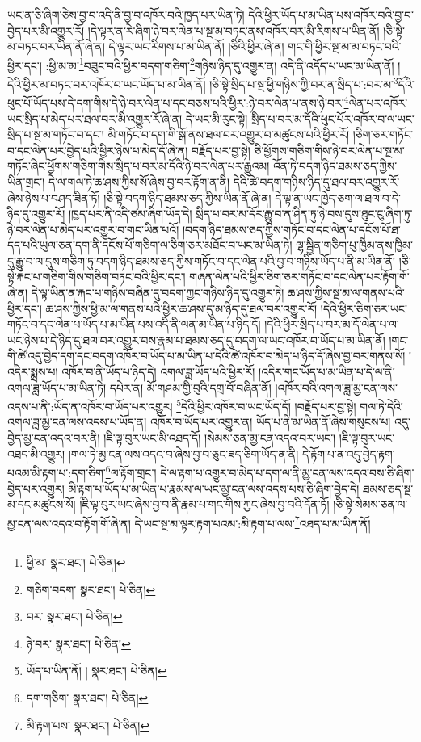 ཡང་ན་ཅི་ཞིག་ཅེས་བྱ་བ་འདི་ནི་བྱ་བ་འཁོར་བའི་ཁྱད་པར་ཡིན་ཏེ། དེའི་ཕྱིར་ཡོད་པ་མ་ཡིན་པས་འཁོར་བའི་བྱ་བ་བྱེད་པར་མི་འགྱུར་རོ། །དེ་ལྟར་ན་རེ་ཞིག་ཉེ་བར་ལེན་པ་སྔ་མ་བཏང་ནས་འཁོར་བར་མི་རིགས་པ་ཡིན་ནོ། །ཅི་སྟེ་མ་བཏང་བར་ཡིན་ནོ་ཞེ་ན། དེ་ལྟར་ཡང་རིགས་པ་མ་ཡིན་ནོ། །ཅིའི་ཕྱིར་ཞེ་ན། གང་གི་ཕྱིར་སྔ་མ་མ་བཏང་བའི་ཕྱིར་དང་། :ཕྱི་མ་མ་\footnote{ཕྱི་མ་  སྣར་ཐང་།  པེ་ཅིན། }བཟུང་བའི་ཕྱིར་བདག་གཅིག་\footnote{གཅིག་བདག་  སྣར་ཐང་།  པེ་ཅིན། }གཉིས་ཉིད་དུ་འགྱུར་ན། འདི་ནི་འདོད་པ་ཡང་མ་ཡིན་ནོ། །དེའི་ཕྱིར་མ་བཏང་བར་འཁོར་བ་ཡང་ཡོད་པ་མ་ཡིན་ནོ། །ཅི་སྟེ་སྲིད་པ་སྔ་ཕྱི་གཉིས་ཀྱི་བར་ན་སྲིད་པ་:བར་མ་\footnote{བར་  སྣར་ཐང་།  པེ་ཅིན། }དོའི་ཕུང་པོ་ཡོད་པས་དེ་དག་གིས་དེ་ཉེ་བར་ལེན་པ་དང་བཅས་པའི་ཕྱིར་:ཉེ་བར་ལེན་པ་ནས་ཉེ་བར་\footnote{ཉེ་བར་  སྣར་ཐང་།  པེ་ཅིན། }ལེན་པར་འཁོར་ཡང་སྲིད་པ་མེད་པར་ཐལ་བར་མི་འགྱུར་རོ་ཞེ་ན། དེ་ཡང་མི་རུང་སྟེ། སྲིད་པ་བར་མ་དོའི་ཕུང་པོར་འཁོར་བ་ལ་ཡང་སྲིད་པ་སྔ་མ་གཏོང་བ་དང་། མི་གཏོང་བ་དག་གི་སྒོ་ནས་ཐལ་བར་འགྱུར་བ་མཚུངས་པའི་ཕྱིར་རོ། །ཅིག་ཅར་གཏོང་བ་དང་ལེན་པར་བྱེད་པའི་ཕྱིར་ཉེས་པ་མེད་དོ་ཞེ་ན། བརྗོད་པར་བྱ་སྟེ། ཅི་ཕྱོགས་གཅིག་གིས་ཉེ་བར་ལེན་པ་སྔ་མ་གཏོང་ཞིང་ཕྱོགས་གཅིག་གིས་སྲིད་པ་བར་མ་དོའི་ཉེ་བར་ལེན་པར་རྒྱུའམ། འོན་ཏེ་བདག་ཉིད་ཐམས་ཅད་ཀྱིས་ཡིན་གྲང་། དེ་ལ་གལ་ཏེ་ཆ་ཤས་ཀྱིས་སོ་ཞེས་བྱ་བར་རྟོག་ན་ནི། དེའི་ཚེ་བདག་གཉིས་ཉིད་དུ་ཐལ་བར་འགྱུར་རོ་ཞེས་ཉེས་པ་བཤད་ཟིན་ཏོ། །ཅི་སྟེ་བདག་ཉིད་ཐམས་ཅད་ཀྱིས་ཡིན་ནོ་ཞེ་ན། དེ་ལྟ་ན་ཡང་ཁྱེད་ཅག་ལ་ཐལ་བ་དེ་ཉིད་དུ་འགྱུར་རོ། །ཁྱད་པར་ནི་འདི་ཙམ་ཞིག་ཡོད་དེ། སྲིད་པ་བར་མ་དོར་རྒྱུ་བ་ན་ཤིན་ཏུ་ཉེ་བས་དུས་ཐུང་ངུ་ཞིག་ཏུ་ཉེ་བར་ལེན་པ་མེད་པར་འགྱུར་བ་གང་ཡིན་པའོ། །བདག་ཉིད་ཐམས་ཅད་ཀྱིས་གཏོང་བ་དང་ལེན་པ་དངོས་པོ་ཐ་དད་པའི་ཡུལ་ཅན་དག་ནི་དངོས་པོ་གཅིག་ལ་ཅིག་ཅར་མཐོང་བ་ཡང་མ་ཡིན་ཏེ། ལྷ་སྦྱིན་གཅིག་པུ་ཁྱིམ་ནས་ཁྱིམ་དུ་རྒྱུ་བ་ལ་དུས་གཅིག་ཏུ་བདག་ཉིད་ཐམས་ཅད་ཀྱིས་གཏོང་བ་དང་ལེན་པའི་བྱ་བ་གཉིས་ཡོད་པ་ནི་མ་ཡིན་ནོ། །ཅི་སྟེ་རྐང་པ་གཅིག་གིས་གཅིག་བཏང་བའི་ཕྱིར་དང་། གཞན་ལེན་པའི་ཕྱིར་ཅིག་ཅར་གཏོང་བ་དང་ལེན་པར་རྟོག་གོ་ཞེ་ན། དེ་ལྟ་ཡིན་ན་རྐང་པ་གཉིས་བཞིན་དུ་བདག་ཀྱང་གཉིས་ཉིད་དུ་འགྱུར་ཏེ། ཆ་ཤས་ཀྱིས་སྔ་མ་ལ་གནས་པའི་ཕྱིར་དང་། ཆ་ཤས་ཀྱིས་ཕྱི་མ་ལ་གནས་པའི་ཕྱིར་ཆ་ཤས་དུ་མ་ཉིད་དུ་ཐལ་བར་འགྱུར་རོ། །དེའི་ཕྱིར་ཅིག་ཅར་ཡང་གཏོང་བ་དང་ལེན་པ་ཡོད་པ་མ་ཡིན་པས་འདི་ནི་ལན་མ་ཡིན་པ་ཉིད་དོ། །དེའི་ཕྱིར་སྲིད་པ་བར་མ་དོ་ལེན་པ་ལ་ཡང་ཉེས་པ་དེ་ཉིད་དུ་ཐལ་བར་འགྱུར་བས་རྣམ་པ་ཐམས་ཅད་དུ་བདག་ལ་ཡང་འཁོར་བ་ཡོད་པ་མ་ཡིན་ནོ། །གང་གི་ཚེ་འདུ་བྱེད་དག་དང་བདག་འཁོར་བ་ཡོད་པ་མ་ཡིན་པ་དེའི་ཚེ་འཁོར་བ་མེད་པ་ཉིད་དོ་ཞེས་བྱ་བར་གནས་སོ། །འདིར་སྨྲས་པ། འཁོར་བ་ནི་ཡོད་པ་ཉིད་དེ། འགལ་ཟླ་ཡོད་པའི་ཕྱིར་རོ། །འདིར་གང་ཡོད་པ་མ་ཡིན་པ་དེ་ལ་ནི་འགལ་ཟླ་ཡོད་པ་མ་ཡིན་ཏེ། དཔེར་ན། མོ་གཤམ་གྱི་བུའི་དགྲ་བོ་བཞིན་ནོ། །འཁོར་བའི་འགལ་ཟླ་མྱ་ངན་ལས་འདས་པ་ནི་:ཡོད་ན་འཁོར་བ་ཡོད་པར་འགྱུར། \footnote{ཡོད་པ་ཡིན་ནོ། །   སྣར་ཐང་།  པེ་ཅིན། }དེའི་ཕྱིར་འཁོར་བ་ཡང་ཡོད་དོ། །བརྗོད་པར་བྱ་སྟེ། གལ་ཏེ་དེའི་འགལ་ཟླ་མྱ་ངན་ལས་འདས་པ་ཡོད་ན། འཁོར་བ་ཡོད་པར་འགྱུར་ན། ཡོད་པ་ནི་མ་ཡིན་ནོ་ཞེས་གསུངས་པ། འདུ་བྱེད་མྱ་ངན་འདའ་བར་ནི། །ཇི་ལྟ་བུར་ཡང་མི་འཐད་དོ། །སེམས་ཅན་མྱ་ངན་འདའ་བར་ཡང་། །ཇི་ལྟ་བུར་ཡང་འཐད་མི་འགྱུར། །གལ་ཏེ་མྱ་ངན་ལས་འདའ་བ་ཞེས་བྱ་བ་ཅུང་ཟད་ཅིག་ཡོད་ན་ནི། དེ་རྟོག་པ་ན་འདུ་བྱེད་རྟག་པའམ་མི་རྟག་པ་:དག་ཅིག་\footnote{དག་གཅིག་  སྣར་ཐང་།  པེ་ཅིན། }ལ་རྟོག་གྲང་། དེ་ལ་རྟག་པ་འགྱུར་བ་མེད་པ་དག་ལ་ནི་མྱ་ངན་ལས་འདའ་བས་ཅི་ཞིག་བྱེད་པར་འགྱུར། མི་རྟག་པ་ཡོད་པ་མ་ཡིན་པ་རྣམས་ལ་ཡང་མྱ་ངན་ལས་འདས་པས་ཅི་ཞིག་བྱེད་དེ། ཐམས་ཅད་སྔ་མ་དང་མཚུངས་སོ། །ཇི་ལྟ་བུར་ཡང་ཞེས་བྱ་བ་ནི་རྣམ་པ་གང་གིས་ཀྱང་ཞེས་བྱ་བའི་དོན་ཏོ། །ཅི་སྟེ་སེམས་ཅན་ལ་མྱ་ངན་ལས་འདའ་བ་རྟོག་གོ་ཞེ་ན། དེ་ཡང་སྔ་མ་ལྟར་རྟག་པའམ་:མི་རྟག་པ་ལས་\footnote{མི་རྟག་པས་  སྣར་ཐང་།  པེ་ཅིན། }འཐད་པ་མ་ཡིན་ནོ། 
